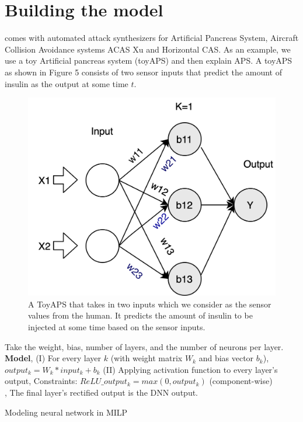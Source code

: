 \section{Building the model}
\label{section:attacks}
\tool comes with automated attack synthesizers for Artificial Pancreas System, Aircraft Collision Avoidance systems ACAS Xu and Horizontal CAS. %
As an example, we use a toy Artificial pancreas system (toyAPS) and then explain APS. A toyAPS as shown in Figure 5 consists of two sensor inputs that predict the amount of insulin as the output at some time $t$. 
\begin{figure}
	\centering
	\includegraphics[width=0.7\linewidth]{Images/ToyAPS}
	\caption[A ToyAPS]{A ToyAPS that takes in two inputs which we consider as the sensor values from the human. It predicts the amount of insulin to be injected at some time based on the sensor inputs.}
	\label{fig:toyaps}
\end{figure}


\begin{algorithm}
	Take the weight, bias, number of layers, and the number of neurons per layer. \\
	
	\textbf{Model}, \linebreak
	(I) For every layer $k$ (with weight matrix $W_k$ and bias vector $b_k$), $output_k = W_k * input_k + b_k$
	\linebreak
	(II) Applying activation function to every layer's output,
	\linebreak
	Constraints: $ReLU\_output_k = max(0, output_k)$ (component-wise) \\,
	\linebreak
	The final layer's rectified output is the DNN output.
	
	\caption{Modeling neural network in MILP}
	\label{algo:b}
\end{algorithm}


